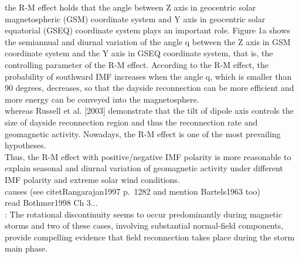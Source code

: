 the R-M effect holds that the angle between Z axis in geocentric solar magnetospheric (GSM) coordinate system and Y axis in geocentric solar equatorial (GSEQ) coordinate system plays an important role. Figure 1a shows the semiannual and diurnal variation of the angle q between the Z axis in GSM coordinate system and the Y axis in GSEQ coordinate system, that is, the controlling parameter of the R-M effect. According to the R-M effect, the probability of southward IMF increases when the angle q, which is smaller than 90 degrees, decreases, so that the dayside reconnection can be more efficient and more energy can be conveyed into the magnetosphere. \citep{Zhao2012}\\

whereas Russell et al. [2003] demonstrate that the tilt of dipole axis controls the size of dayside reconnection region and thus the reconnection rate and geomagnetic activity. Nowadays, the R-M effect is one of the most prevailing hypotheses. \citep{Zhao2012}\\
Thus, the R-M effect with positive/negative IMF polarity is more reasonable to explain seasonal and diurnal variation of geomagnetic activity under different IMF polarity and extreme solar wind conditions. \citep{Zhao2012}\\


causes (see citet{Rangarajan1997} p.~1282 and mention Bartels1963 too)\\
read Bothmer1998 Ch 3...\\


\citet{Sonnerup1967}: The rotational discontinuity seems to occur predominantly during magnetic storms and two of these cases, involving substantial normal-field components, provide compelling evidence that field reconnection takes place during the storm main phase.\\




